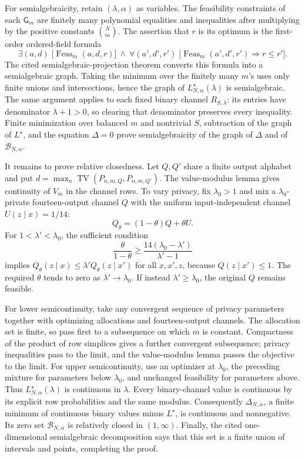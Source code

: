 For semialgebraicity, retain \((\lambda,\alpha)\) as variables.  The feasibility constraints of each \(\mathsf G_m\) are finitely many polynomial equalities and inequalities after multiplying by the positive constants \(\binom Nm\).  The assertion that \(r\) is its optimum is the first-order ordered-field formula
\[
 \exists(a,d)\;\bigl[\operatorname{Feas}_m(a,d,r)\bigr]
 \ \wedge\ 
 \forall(a',d',r')\;\bigl[
 \operatorname{Feas}_m(a',d',r')\Longrightarrow r\le r'
 \bigr].
\]
The cited semialgebraic-projection theorem converts this formula into a semialgebraic graph.  Taking the minimum over the finitely many \(m\)'s uses only finite unions and intersections, hence the graph of \(L^\star_{N,\alpha}(\lambda)\) is semialgebraic.  The same argument applies to each fixed binary channel \(R_{S,\lambda}\): its entries have denominator \(\lambda+1>0\), so clearing that denominator preserves every inequality.  Finite minimization over balanced \(m\) and nontrivial \(S\), subtraction of the graph of \(L^\star\), and the equation \(\Delta=0\) prove semialgebraicity of the graph of \(\Delta\) and of \(\mathcal B_{N,\alpha}\).

It remains to prove relative closedness.  Let \(Q,Q'\) share a finite output alphabet and put \(d=\max_n\operatorname{TV}(P_{n,m,Q},P_{n,m,Q'})\).  The value-modulus lemma gives continuity of \(V_m\) in the channel rows.  To vary privacy, fix \(\lambda_0>1\) and mix a \(\lambda_0\)-private fourteen-output channel \(Q\) with the uniform input-independent channel \(U(z\mid x)=1/14\):
\[
 Q_\theta=(1-\theta)Q+\theta U.
\]
For \(1<\lambda'<\lambda_0\), the sufficient condition
\[
 \frac{\theta}{1-\theta}\ge
 \frac{14(\lambda_0-\lambda')}{\lambda'-1}
\]
implies \(Q_\theta(z\mid x)\le\lambda'Q_\theta(z\mid x')\) for all \(x,x',z\), because \(Q(z\mid x')\le1\).  The required \(\theta\) tends to zero as \(\lambda'\to\lambda_0\).  If instead \(\lambda'\ge\lambda_0\), the original \(Q\) remains feasible.

For lower semicontinuity, take any convergent sequence of privacy parameters together with optimizing allocations and fourteen-output channels.  The allocation set is finite, so pass first to a subsequence on which \(m\) is constant.  Compactness of the product of row simplices gives a further convergent subsequence; privacy inequalities pass to the limit, and the value-modulus lemma passes the objective to the limit.  For upper semicontinuity, use an optimizer at \(\lambda_0\), the preceding mixture for parameters below \(\lambda_0\), and unchanged feasibility for parameters above.  Thus \(L^\star_{N,\alpha}(\lambda)\) is continuous in \(\lambda\).  Every binary-channel value is continuous by its explicit row probabilities and the same modulus.  Consequently \(\Delta_{N,\alpha}\), a finite minimum of continuous binary values minus \(L^\star\), is continuous and nonnegative.  Its zero set \(\mathcal B_{N,\alpha}\) is relatively closed in \((1,\infty)\).  Finally, the cited one-dimensional semialgebraic decomposition says that this set is a finite union of intervals and points, completing the proof.

